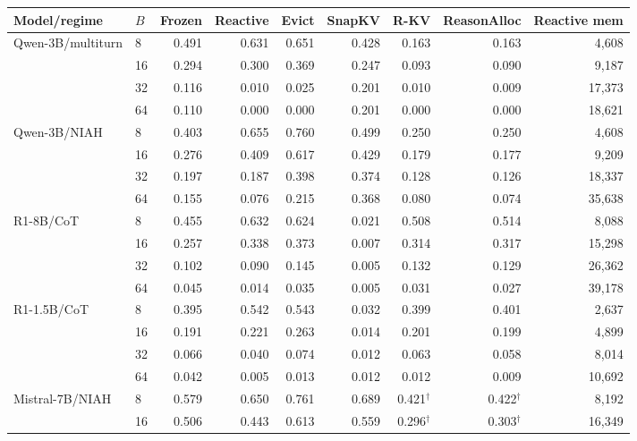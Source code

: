 \documentclass{article}
\begin{document}
\begin{table}[h]
\centering
\footnotesize
\begin{tabular}{llrrrrrrr}
\toprule
Model/regime & $B$ & Frozen & Reactive & Evict & SnapKV & R-KV & ReasonAlloc & Reactive mem \\
\midrule
Qwen-3B/multiturn & 8  & 0.491 & 0.631 & 0.651 & 0.428 & 0.163 & 0.163 & 4{,}608 \\
                   & 16 & 0.294 & 0.300 & 0.369 & 0.247 & 0.093 & 0.090 & 9{,}187 \\
                   & 32 & 0.116 & 0.010 & 0.025 & 0.201 & 0.010 & 0.009 & 17{,}373 \\
                   & 64 & 0.110 & 0.000 & 0.000 & 0.201 & 0.000 & 0.000 & 18{,}621 \\
\midrule
Qwen-3B/NIAH       & 8  & 0.403 & 0.655 & 0.760 & 0.499 & 0.250 & 0.250 & 4{,}608 \\
                   & 16 & 0.276 & 0.409 & 0.617 & 0.429 & 0.179 & 0.177 & 9{,}209 \\
                   & 32 & 0.197 & 0.187 & 0.398 & 0.374 & 0.128 & 0.126 & 18{,}337 \\
                   & 64 & 0.155 & 0.076 & 0.215 & 0.368 & 0.080 & 0.074 & 35{,}638 \\
\midrule
R1-8B/CoT          & 8  & 0.455 & 0.632 & 0.624 & 0.021 & 0.508 & 0.514 & 8{,}088 \\
                   & 16 & 0.257 & 0.338 & 0.373 & 0.007 & 0.314 & 0.317 & 15{,}298 \\
                   & 32 & 0.102 & 0.090 & 0.145 & 0.005 & 0.132 & 0.129 & 26{,}362 \\
                   & 64 & 0.045 & 0.014 & 0.035 & 0.005 & 0.031 & 0.027 & 39{,}178 \\
\midrule
R1-1.5B/CoT        & 8  & 0.395 & 0.542 & 0.543 & 0.032 & 0.399 & 0.401 & 2{,}637 \\
                   & 16 & 0.191 & 0.221 & 0.263 & 0.014 & 0.201 & 0.199 & 4{,}899 \\
                   & 32 & 0.066 & 0.040 & 0.074 & 0.012 & 0.063 & 0.058 & 8{,}014 \\
                   & 64 & 0.042 & 0.005 & 0.013 & 0.012 & 0.012 & 0.009 & 10{,}692 \\
\midrule
Mistral-7B/NIAH    & 8  & 0.579 & 0.650 & 0.761 & 0.689 & 0.421$^\dagger$ & 0.422$^\dagger$ & 8{,}192 \\
                   & 16 & 0.506 & 0.443 & 0.613 & 0.559 & 0.296$^\dagger$ & 0.303$^\dagger$ & 16{,}349 \\

\end{tabular}
\end{table}
\end{document}
